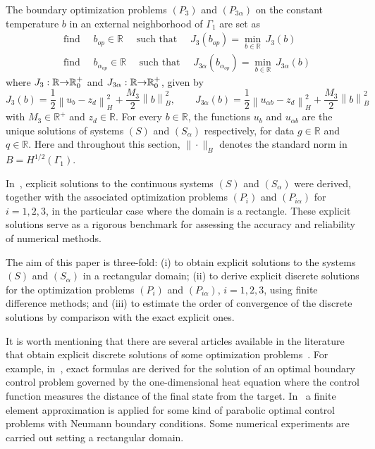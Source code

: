 \documentclass[axioms,article,submit,moreauthors]{Definitions/mdpi}
\begin{document}
The boundary optimization problems $(P_3)$ and $(P_{3\alpha})$ on the constant temperature $b$ in an external neighborhood of $\Gamma_{1}$ are set as
\begingroup
\addtolength{\jot}{0.5em}
\begin{align}
& \text{find }\quad b_{op}\in \mathbb{R} \quad\text{ such
that }\quad J_{3}(b_{op})=\min\limits_{b\in
\mathbb{R}}\,J_{3}(b)
\label{PControlJ3} \\
& \text{find }\quad b_{{\alpha}_{op}}\in
\mathbb{R}\quad\text{ such that }\quad
J_{3\alpha}(b_{{\alpha}_{op}})=\min\limits_{b\in
\mathbb{R}}\,J_{3\alpha}({b})  \label{PControlalfaJ3}
\end{align}
\endgroup
where $J_{3}:\mathbb{R}{\rightarrow}{\Bbb R}_{0}^{+}$ and
$J_{3\alpha}:\mathbb{R}{\rightarrow}{\Bbb R}_{0}^{+}$, given by
\begin{equation}\label{J3-J3alpha}
J_{3}(b)=\frac{1}{2}\left\| u_{b}-z_{d}\right\|
_{H}^{2}+\frac{M_{3}}{2}\left\| b\right\|_{B}^{2},\qquad J_{3\alpha}(b)=\frac{1}{2}\left\| u_{\alpha b}-z_{d}\right\|
_{H}^{2}+\frac{M_{3}}{2}\left\| b\right\|_{B}^{2}
\end{equation}
\noindent with $M_3\in\mathbb{R}^+$ and $z_d\in \mathbb{R}$. For every $b\in\mathbb{R}$, the functions $u_{b}$ and $u_{\alpha b}$ are the unique solutions of  systems $(S)$ and $(S_\alpha)$ respectively, for data $g\in \mathbb{R}$ and $q\in\mathbb{R}$. 
{Here and throughout this section, $\|\cdot\|_B$ denotes the standard norm in $B=H^{1/2}(\Gamma_1)$.
}

{ In~\cite{BoGaTa2020}, explicit solutions to the continuous systems $(S)$ and $(S_\alpha)$ were derived, together with  the associated optimization problems $(P_i)$ and $(P_{i\alpha})$ for $i=1,2,3$, in the particular case where the domain is a rectangle. These explicit solutions serve as a rigorous benchmark for assessing the accuracy and reliability of numerical methods.}
  
{The aim of this paper is three-fold: 
(i) to obtain explicit solutions to the systems $(S)$ and $(S_\alpha)$ in a rectangular domain; 
(ii) to derive explicit discrete solutions for the optimization problems $(P_i)$ and $(P_{i\alpha})$, $i=1,2,3$, using finite difference methods; 
and (iii) to estimate the order of convergence of the discrete solutions by comparison with the exact explicit ones.}
 
It is worth mentioning that there are several articles available in the literature that obtain explicit  discrete  solutions of some optimization problems~\cite{An1968,ArMoUg2011}. 
For example, in~\cite{LaSc2023},  exact formulas are derived for the solution of an optimal boundary control problem governed by the one-dimensional heat equation where the control function  measures the distance of the final state from the target. In~\cite{YaSu2023} a finite element approximation is applied for some kind of parabolic optimal control problems with Neumann boundary conditions. Some numerical experiments are carried out setting a rectangular domain.
\end{document}
